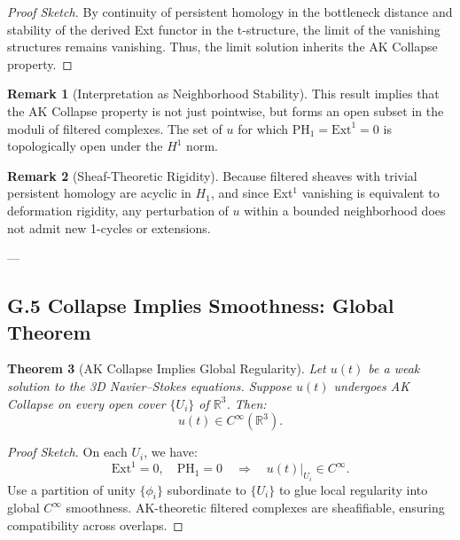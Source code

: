 \documentclass[11pt]{article}
\newtheorem{theorem}{Theorem}[section]
\theoremstyle{definition}
\newtheorem{remark}[theorem]{Remark}
\begin{document}
\begin{proof}[Proof Sketch]
By continuity of persistent homology in the bottleneck distance and stability of the derived Ext functor in the t-structure,  
the limit of the vanishing structures remains vanishing. Thus, the limit solution inherits the AK Collapse property.
\end{proof}

\begin{remark}[Interpretation as Neighborhood Stability]
This result implies that the AK Collapse property is not just pointwise, but forms an open subset in the moduli of filtered complexes.  
The set of $u$ for which $\mathrm{PH}_1 = \mathrm{Ext}^1 = 0$ is topologically open under the $H^1$ norm.
\end{remark}

\begin{remark}[Sheaf-Theoretic Rigidity]
Because filtered sheaves with trivial persistent homology are acyclic in $H_1$,  
and since Ext$^1$ vanishing is equivalent to deformation rigidity,  
any perturbation of $u$ within a bounded neighborhood does not admit new 1-cycles or extensions.
\end{remark}

---

\subsection*{G.5 Collapse Implies Smoothness: Global Theorem}

\begin{theorem}[AK Collapse Implies Global Regularity]
Let $u(t)$ be a weak solution to the 3D Navier–Stokes equations.  
Suppose $u(t)$ undergoes AK Collapse on every open cover $\{ U_i \}$ of $\mathbb{R}^3$.  
Then:
\[
u(t) \in C^\infty(\mathbb{R}^3).
\]
\end{theorem}

\begin{proof}[Proof Sketch]
On each $U_i$, we have:
\[
\mathrm{Ext}^1 = 0, \quad \mathrm{PH}_1 = 0 \quad \Rightarrow \quad u(t)|_{U_i} \in C^\infty.
\]
Use a partition of unity $\{\phi_i\}$ subordinate to $\{U_i\}$ to glue local regularity into global $C^\infty$ smoothness.  
AK-theoretic filtered complexes are sheafifiable, ensuring compatibility across overlaps.
\end{proof}
\end{document}
